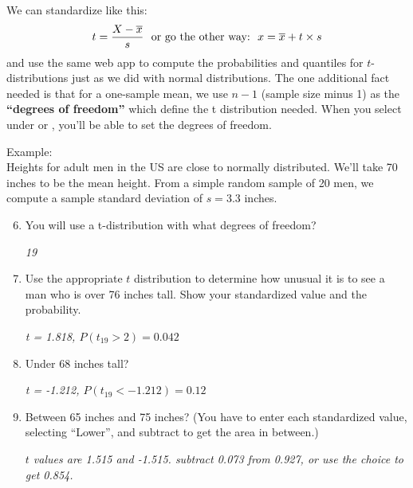 We can standardize like this:
$$ t = \frac{X - \overline{x}}{s}\mbox{\ \  or go the other way:\ \ } x = \overline{x}
+ t \times s$$
and use the same web app to compute the 
probabilities and quantiles for $t$-distributions just as we did with normal
distributions. The one additional fact needed is that for a one-sample
mean, we use $n-1$ (sample size minus 1) as the {\bf``degrees of
  freedom''} which define the t distribution needed.  When you select
 under  or , you'll be able to set
the degrees of freedom.

Example:\\
Heights for adult men in the US are close to normally distributed.
We'll take 70 inches to be the mean height. From a simple random
sample of 20 men,  we compute a sample standard deviation of $s = 3.3$
inches.  
\begin{enumerate}
\setcounter{enumi}{5}
\item You will use a t-distribution with what degrees of freedom?
\begin{students}
        \vspace{1cm}        
\end{students}

\begin{key}
 {\it 19}
\end{key}

\item Use the appropriate $t$ distribution to determine how unusual it
  is to see a man who is over 76 inches tall. Show your standardized
  value and the probability.
\begin{students}
        \vspace{1cm}        
\end{students}

\begin{key}
 {\it t = 1.818, $P(t_{19} > 2) = 0.042$ }
\end{key}

\item Under 68 inches tall?
\begin{students}
        \vspace{1cm}        
\end{students}

\begin{key}
{\it  t = -1.212, $P(t_{19} < -1.212) = 0.12$ }
\end{key}

\item Between 65 inches and 75 inches? (You have to enter each
  standardized value, selecting ``Lower'', and subtract to get the
  area in between.)
\begin{students}
        \vspace{1cm}        
\end{students}

\begin{key}
 {\it $t$ values are 1.515 and -1.515. subtract 0.073 from 0.927,
    or use the  choice to get 0.854. }
\end{key}

\end{enumerate}



